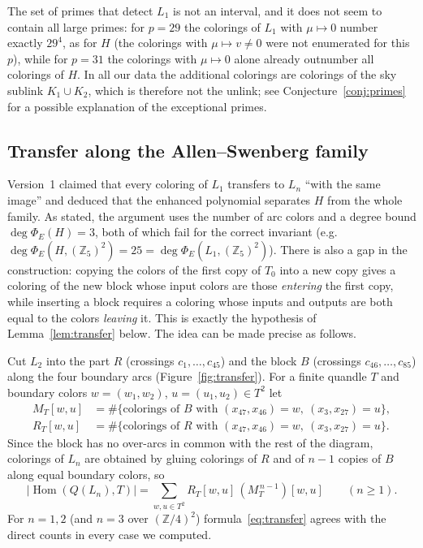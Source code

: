 \documentclass[11pt]{article}
\theoremstyle{definition}
\newcommand{\Z}{\mathbb{Z}}
\newcommand{\Hom}{\operatorname{Hom}}
\newcommand{\PhiE}{\Phi_E}
\begin{document}
The set of primes that detect $L_1$ is not an interval, and it does not seem to contain all large
primes: for $p=29$ the colorings of $L_1$ with $\mu\mapsto0$ number exactly $29^4$, as for $H$ (the
colorings with $\mu\mapsto v\neq0$ were not enumerated for this $p$), while for $p=31$ the colorings with $\mu\mapsto0$ alone already outnumber all colorings of $H$. In all our data the additional
colorings are colorings of the sky sublink $K_1\cup K_2$, which is therefore not the unlink; see
Conjecture~\ref{conj:primes} for a possible explanation of the exceptional primes.

\subsection{Transfer along the Allen--Swenberg family}\label{ssec:transfer}

Version~1 claimed that every coloring of $L_1$ transfers to $L_n$ ``with the same image'' and deduced
that the enhanced polynomial separates $H$ from the whole family. As stated, the argument uses the
number of arc colors and a degree bound $\deg\PhiE(H)=3$, both of which fail for the correct invariant
(e.g.\ $\deg\PhiE(H,(\Z_5)^2)=25=\deg\PhiE(L_1,(\Z_5)^2)$). There is also a gap in the construction:
copying the colors of the first copy of $T_0$ into a new copy gives a coloring of the new block whose
input colors are those \emph{entering} the first copy, while inserting a block requires a coloring whose
inputs and outputs are both equal to the colors \emph{leaving} it. This is exactly the hypothesis of
Lemma~\ref{lem:transfer} below. The idea can be made precise as follows.

Cut $L_2$ into the part $R$ (crossings $c_1,\dots,c_{45}$) and the block $B$ (crossings
$c_{46},\dots,c_{85}$) along the four boundary arcs (Figure~\ref{fig:transfer}). For a finite quandle
$T$ and boundary colors $w=(w_1,w_2)$, $u=(u_1,u_2)\in T^2$ let
\begin{align*}
M_T[w,u]&=\#\{\text{colorings of }B\text{ with }(x_{47},x_{46})=w,\ (x_3,x_{27})=u\},\\
R_T[w,u]&=\#\{\text{colorings of }R\text{ with }(x_{47},x_{46})=w,\ (x_3,x_{27})=u\}.
\end{align*}
Since the block has no over-arcs in common with the rest of the diagram, colorings of $L_n$ are obtained
by gluing colorings of $R$ and of $n-1$ copies of $B$ along equal boundary colors, so
\begin{equation}\label{eq:transfer}
|\Hom(Q(L_n),T)|=\sum_{w,u\in T^2}R_T[w,u]\,(M_T^{\,n-1})[w,u]\qquad(n\ge1).
\end{equation}
For $n=1,2$ (and $n=3$ over $(\Z/4)^2$) formula~\eqref{eq:transfer} agrees with the direct counts in every
case we computed.
\end{document}
